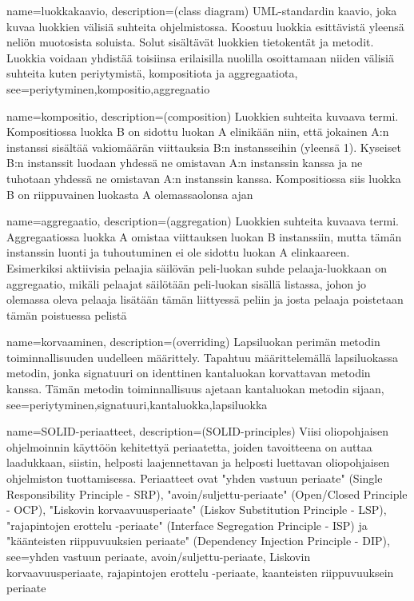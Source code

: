 {	
	name=luokkakaavio,
	description={(class diagram) UML-standardin kaavio, joka kuvaa luokkien välisiä suhteita
ohjelmistossa. Koostuu luokkia esittävistä yleensä neliön muotosista soluista. Solut sisältävät
luokkien tietokentät ja metodit. Luokkia voidaan yhdistää toisiinsa erilaisilla nuolilla
osoittamaan niiden välisiä suhteita kuten periytymistä, kompositiota ja aggregaatiota},
	see={periytyminen,kompositio,aggregaatio}
}

{
	name=kompositio,
	description={(composition) Luokkien suhteita kuvaava termi. Kompositiossa luokka B on sidottu
luokan A elinikään niin, että jokainen A:n instanssi sisältää vakiomäärän viittauksia B:n
instansseihin (yleensä 1). Kyseiset B:n instanssit luodaan yhdessä ne omistavan A:n instanssin
kanssa ja ne tuhotaan yhdessä ne omistavan A:n instanssin kanssa. Kompositiossa siis luokka B on
riippuvainen luokasta A olemassaolonsa ajan}
}

{
	name=aggregaatio,
	description={(aggregation) Luokkien suhteita kuvaava termi. Aggregaatiossa luokka A omistaa
viittauksen luokan B instanssiin, mutta tämän instanssin luonti ja tuhoutuminen ei ole sidottu
luokan A elinkaareen. Esimerkiksi aktiivisia pelaajia säilövän peli-luokan suhde pelaaja-luokkaan
on aggregaatio, mikäli pelaajat säilötään peli-luokan sisällä listassa, johon jo olemassa oleva
pelaaja lisätään tämän liittyessä peliin ja josta pelaaja poistetaan tämän poistuessa pelistä}
}

{
	name=korvaaminen,
	description={(overriding) Lapsiluokan perimän metodin toiminnallisuuden uudelleen määrittely.
Tapahtuu määrittelemällä lapsiluokassa metodin, jonka signatuuri on identtinen kantaluokan
korvattavan metodin kanssa. Tämän metodin toiminnallisuus ajetaan kantaluokan metodin sijaan},
	see={periytyminen,signatuuri,kantaluokka,lapsiluokka}
}

{
	name=SOLID-periaatteet,
	description={(SOLID-principles) Viisi oliopohjaisen ohjelmoinnin käyttöön kehitettyä
periaatetta, joiden tavoitteena on auttaa laadukkaan, siistin, helposti laajennettavan ja helposti
luettavan oliopohjaisen ohjelmiston tuottamisessa. Periaatteet ovat "yhden vastuun periaate"
(Single Responsibility Principle - SRP), "avoin/suljettu-periaate" (Open/Closed Principle - OCP),
"Liskovin korvaavuusperiaate" (Liskov Substitution Principle - LSP), "rajapintojen erottelu
-periaate" (Interface Segregation Principle - ISP) ja "käänteisten riippuvuuksien periaate"
(Dependency Injection Principle - DIP)},
	see={yhden vastuun periaate,  avoin/suljettu-periaate, Liskovin korvaavuusperiaate, 
	rajapintojen erottelu -periaate, kaanteisten riippuvuuksein periaate}
}

